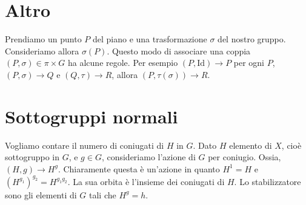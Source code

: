 \documentclass[a4paper]{article}
\begin{document}
%
%
%
%
%
%
%
%
%

\section{Altro}

Prendiamo un punto \(P\) del piano e una trasformazione \(\sigma\) del nostro gruppo.
Consideriamo allora \(\sigma(P)\). Questo modo di associare una coppia
\((P, \sigma) \in \pi \times G\) ha alcune regole.
Per esempio \((P, \text{Id}) \to P\) per ogni \(P\),
\((P, \sigma) \to Q\) e \((Q, \tau) \to R\), allora \((P, \tau(\sigma)) \to R\).

\section{Sottogruppi normali}

Vogliamo contare il numero di coniugati di \(H\) in \(G\).
Dato \(H\) elemento di \(X\), cioè sottogruppo in \(G\),
e \(g\in G\), consideriamo l'azione di \(G\) per coniugio.
Ossia, \((H,g) \to H^g\). Chiaramente questa è un'azione in quanto
\(H^1 = H\) e \({(H^{g_1})}^{g_2} = H^{g_1g_2}\).
La sua orbita è l'insieme dei coniugati di \(H\). Lo stabilizzatore
sono gli elementi di \(G\) tali che \(H^g = h\).
\end{document}
